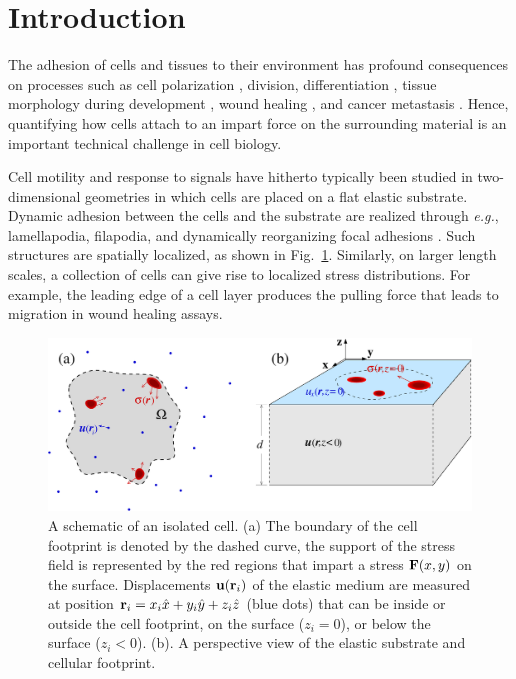 \documentclass[aps,prl,reprint,twocolumn,groupedaddress,showpacs]{revtex4-1}
\def\r{{\bf r}}
\begin{document}
\section{Introduction}

The adhesion of cells and tissues to their environment has profound
consequences on processes such as cell polarization \cite{MASHA2011},
division, differentiation \cite{DIFFERENTIATION0}, tissue morphology
during development \cite{DEVELOPMENT0}, wound healing
\cite{WOUND0,WOUND2,WOUND1}, and cancer metastasis
\cite{CANCER0}. Hence, quantifying how cells attach to an impart force
on the surrounding material is an important technical challenge in
cell biology.

Cell motility and response to signals have hitherto typically been
studied in two-dimensional geometries in which cells are placed on a
flat elastic substrate.  Dynamic adhesion between the cells and the
substrate are realized through {\it e.g.}, lamellapodia, filapodia,
and dynamically reorganizing focal adhesions \cite{MBOC}.  Such structures are
spatially localized, as shown in Fig.~\ref{FIG1}. Similarly, on larger
length scales, a collection of cells can give rise to localized stress
distributions. For example, the leading edge of a cell layer produces
the pulling force that leads to migration in wound healing assays.

\begin{figure}[t]
\begin{center}
\includegraphics[width=\linewidth]{Fig1.pdf}
\caption{A schematic of an isolated cell. (a) The boundary of the cell
  footprint is denoted by the dashed curve, the support of the stress field is
  represented by the red regions that impart a stress ${\bf F}(x,y)$
  on the surface. Displacements ${\bf u}(\r_{i})$ of the elastic
  medium are measured at position $\r_{i} =
  x_{i}\hat{x}+y_{i}\hat{y}+z_{i}\hat{z}$ (blue dots) that can be
  inside or outside the cell footprint, on the surface ($z_{i}=0$), or
  below the surface ($z_{i}<0$). (b). A perspective view of the
  elastic substrate and cellular footprint.}
\label{FIG1}
\end{center}
\end{figure}
\end{document}
